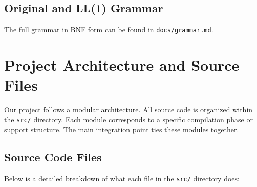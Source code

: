 \documentclass[12pt,a4paper]{article}
\begin{document}
\subsection{Original and LL(1) Grammar}
The full grammar in BNF form can be found in \texttt{docs/grammar.md}.


\section{Project Architecture and Source Files}
Our project follows a modular architecture. All source code is organized within the \texttt{src/} directory. Each module corresponds to a specific compilation phase or support structure. The main integration point ties these modules together.

\subsection{Source Code Files}
Below is a detailed breakdown of what each file in the \texttt{src/} directory does:
\end{document}
